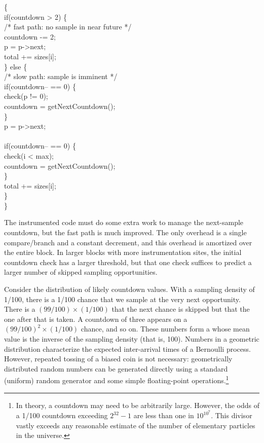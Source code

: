 \begin{code}
  \{\+ \\
  if(countdown > 2) \{ \\
  \> /* fast path: no sample in near future */ \\
  \> countdown -= 2; \\
  \> \up p = p->next; \\
  \> \up total += sizes[i]; \\
  \} else \{ \\
  \> /* slow path: sample is imminent */ \\
  \> if(countdown-- == 0) \{ \\
  \>\> check(p != 0); \\
  \>\> countdown = getNextCountdown(); \\
  \> \} \\
  \> \up p = p->next; \\
  \> \\
  \> if(countdown-- == 0) \{ \\
  \>\> check(i < max); \\
  \>\> countdown = getNextCountdown(); \\
  \> \} \\
  \> \up total += sizes[i]; \\
  \} \\
  \<\}
\end{code}

The instrumented code must do some extra work to manage the
next-sample countdown, but the fast path is much improved.  The only
overhead is a single compare/branch and a constant decrement, and this
overhead is amortized over the entire block.  In larger blocks with
more instrumentation sites, the initial countdown check has a larger
threshold, but that one check suffices to predict a larger number of
skipped sampling opportunities.

Consider the distribution of likely countdown values.  With a sampling
density of 1/100, there is a 1/100 chance that we sample at the very
next opportunity.  There is a $(99/100) \times (1/100)$ that the next
chance is skipped but that the one after that is taken.  A countdown
of three appears on a $(99/100)^2 \times (1/100)$ chance, and so on.
These numbers form a  whose mean value
is the inverse of the sampling density (that is, 100).  Numbers in a
geometric distribution characterize the expected inter-arrival times
of a Bernoulli process.  However, repeated tossing of a biased coin is
not necessary: geometrically distributed random numbers can be
generated directly using a standard (uniform) random generator and
some simple floating-point operations.\footnote{In theory, a countdown
  may need to be arbitrarily large.  However, the odds of a 1/100
  countdown exceeding $2^{32}-1$ are less than one in $10^{10^7}$.
  This divisor vastly exceeds any reasonable estimate of the number of
  elementary particles in the universe.}

